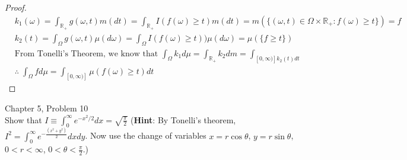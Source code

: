 \documentclass[12pt,letterpaper, onecolumn]{exam}
\newcommand{\real}{\mathbb{R}}
\begin{document}
\begin{questions}
\begin{solution}
\begin{proof}
            \begin{align*}
                & k_1(\omega) = \int_{\real_+}g(\omega, t) m (d t) = \int_{\real_+} I(f(\omega) \geq t) m(dt) = m(\{(\omega, t) \in \Omega \times \real_+: f(\omega) \geq t\}) = f \\
                & k_2(t) = \int_{\Omega}g(\omega, t) \mu (d \omega) = \int_{\Omega}I(f(\omega) \geq t)) \mu (d \omega) = \mu(\{f \geq t\}) \\
                & \textrm{From Tonelli's Theorem, we know that } \int_{\Omega}k_1 d\mu = \int_{\real_+}k_2 dm = \int_{[0, \infty)]k_2(t) dt} \\
                & \therefore \; \int_{\Omega}fd\mu = \int_{[0, \infty)]}\mu(f(\omega) \geq t) dt
            \end{align*}
        \end{proof}
    \end{solution}

    \question Chapter 5, Problem 10 \\
    Show that $I \equiv \int_0^\infty e^{-x^2/2}dx = \sqrt{\frac{\pi}{2}}$
    (\textbf{Hint}: By Tonelli’s theorem, $I^2 = \int_0^\infty e^{-\frac{(x^2 + y^2)}{2}}dxdy$. Now use the change of variables $x = r \cos \theta$, $y = r \sin \theta$, $0<r<\infty$, $0<\theta< \frac{\pi}{2}$.)


\end{questions}
\end{document}
